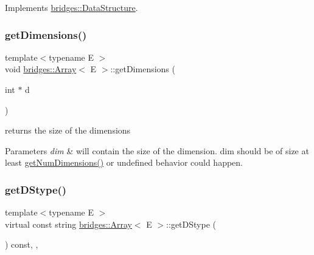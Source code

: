 Implements \mbox{\hyperlink{classbridges_1_1_data_structure}{bridges\+::\+Data\+Structure}}.

\mbox{\label{classbridges_1_1_array_ae195a6f06157e82c68483ff636e30f5e}} 
\subsubsection{\texorpdfstring{get\+Dimensions()}{getDimensions()}}
{\footnotesize\ttfamily template$<$typename E $>$ \\
void \mbox{\hyperlink{classbridges_1_1_array}{bridges\+::\+Array}}$<$ E $>$\+::get\+Dimensions (\begin{DoxyParamCaption}\item[{int $\ast$}]{d }\end{DoxyParamCaption})\hspace{0.3cm}{\ttfamily [inline]}}

returns the size of the dimensions 
\begin{DoxyParams}{Parameters}
{\em dim} & will contain the size of the dimension. dim should be of size at least \mbox{\hyperlink{classbridges_1_1_array_a31edfcff05dd4102fee1840ee915319e}{get\+Num\+Dimensions()}} or undefined behavior could happen. \\
\hline
\end{DoxyParams}
\mbox{\label{classbridges_1_1_array_ab93f7379870a7c0bc63490c53d95ba09}} 
\subsubsection{\texorpdfstring{get\+D\+Stype()}{getDStype()}}
{\footnotesize\ttfamily template$<$typename E $>$ \\
virtual const string \mbox{\hyperlink{classbridges_1_1_array}{bridges\+::\+Array}}$<$ E $>$\+::get\+D\+Stype (\begin{DoxyParamCaption}{ }\end{DoxyParamCaption}) const\hspace{0.3cm}{\ttfamily [inline]}, {\ttfamily [override]}, {\ttfamily [virtual]}}

